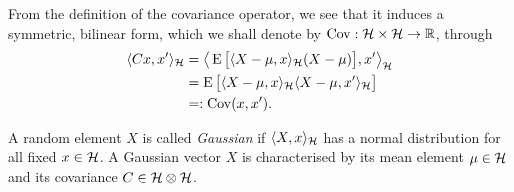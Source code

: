 From the definition of the covariance operator, we see that it induces a symmetric, bilinear form, which we shall denote by $\operatorname{Cov}:{\mathcal H}\times{\mathcal H}\to\mathbb{R}$, through
\begin{align*}
  \langle Cx,x'\rangle_{\mathcal H} 
  &= \big\langle\operatorname{E}\big[\langle X - \mu, x\rangle_{{\mathcal H}}(X - \mu) \big], x' \big\rangle_{\mathcal H} \\
  &= \operatorname{E}\big[\langle X-\mu,x\rangle_{\mathcal H} \langle X-\mu,x'\rangle_{\mathcal H}\big] \\
  &=: \operatorname{Cov}(x,x').
\end{align*}

\begin{definition}
  A random element $X$ is called \emph{Gaussian} if $\langle X,x\rangle_{\mathcal H}$ has a normal distribution for all fixed $x\in{\mathcal H}$.
  A Gaussian vector $X$ is characterised by its mean element $\mu\in{\mathcal H}$ and its covariance $C\in{\mathcal H}\otimes{\mathcal H}$.
\end{definition}





